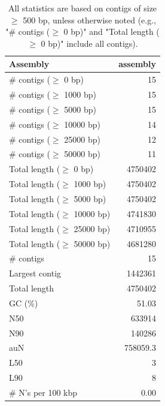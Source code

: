 \documentclass[12pt,a4paper]{article}
\begin{document}
\begin{table}[ht]
\begin{center}
\caption{All statistics are based on contigs of size $\geq$ 500 bp, unless otherwise noted (e.g., "\# contigs ($\geq$ 0 bp)" and "Total length ($\geq$ 0 bp)" include all contigs).}
\begin{tabular}{|l*{1}{|r}|}
\hline
Assembly & assembly \\ \hline
\# contigs ($\geq$ 0 bp) & 15 \\ \hline
\# contigs ($\geq$ 1000 bp) & 15 \\ \hline
\# contigs ($\geq$ 5000 bp) & 15 \\ \hline
\# contigs ($\geq$ 10000 bp) & 14 \\ \hline
\# contigs ($\geq$ 25000 bp) & 12 \\ \hline
\# contigs ($\geq$ 50000 bp) & 11 \\ \hline
Total length ($\geq$ 0 bp) & 4750402 \\ \hline
Total length ($\geq$ 1000 bp) & 4750402 \\ \hline
Total length ($\geq$ 5000 bp) & 4750402 \\ \hline
Total length ($\geq$ 10000 bp) & 4741830 \\ \hline
Total length ($\geq$ 25000 bp) & 4710955 \\ \hline
Total length ($\geq$ 50000 bp) & 4681280 \\ \hline
\# contigs & 15 \\ \hline
Largest contig & 1442361 \\ \hline
Total length & 4750402 \\ \hline
GC (\%) & 51.03 \\ \hline
N50 & 633914 \\ \hline
N90 & 140286 \\ \hline
auN & 758059.3 \\ \hline
L50 & 3 \\ \hline
L90 & 8 \\ \hline
\# N's per 100 kbp & 0.00 \\ \hline
\end{tabular}
\end{center}
\end{table}
\end{document}
